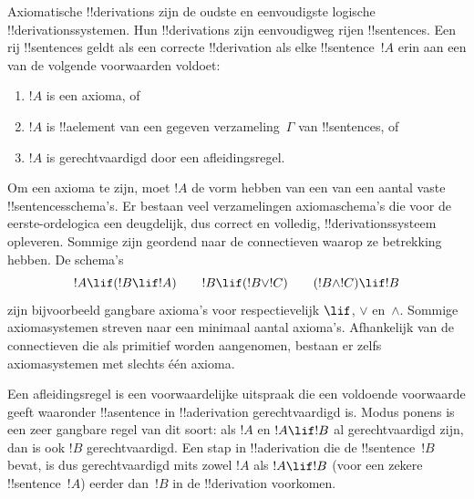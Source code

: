 \documentclass[../../../include/open-logic-section]{subfiles}
\begin{document}
      {}
      {}


Axiomatische !!{derivation}s zijn de oudste en eenvoudigste logische
!!{derivation}ssystemen. Hun !!{derivation}s zijn eenvoudigweg rijen
!!{sentence}s. Een rij !!{sentence}s geldt als een correcte
!!{derivation} als elke !!{sentence}~$!A$ erin aan een van de volgende
voorwaarden voldoet:
\begin{enumerate}
\item $!A$ is een axioma, of
\item $!A$ is !!a{element} van een gegeven verzameling~$\Gamma$ van !!{sentence}s, of
\item $!A$ is gerechtvaardigd door een afleidingsregel.
\end{enumerate}
Om een axioma te zijn, moet $!A$ de vorm hebben van een van een aantal
vaste !!{sentence}sschema's. Er bestaan veel verzamelingen
axiomaschema's die voor de eerste-ordelogica een deugdelijk, dus correct
en volledig, !!{derivation}ssysteem opleveren. Sommige zijn geordend
naar de connectieven waarop ze betrekking hebben. De schema's
\[
!A \lif (!B \lif !A) \qquad !B \lif (!B \lor !C) \qquad (!B \land !C) \lif !B
\]
zijn bijvoorbeeld gangbare axioma's voor respectievelijk $\lif$,
$\lor$ en~$\land$. Sommige axiomasystemen streven naar een minimaal
aantal axioma's. Afhankelijk van de connectieven die als primitief
worden aangenomen, bestaan er zelfs axiomasystemen met slechts één
axioma.

Een afleidingsregel is een voorwaardelijke uitspraak die een voldoende
voorwaarde geeft waaronder !!a{sentence} in !!a{derivation}
gerechtvaardigd is. Modus ponens is een zeer gangbare regel van dit
soort: als $!A$ en $!A \lif !B$ al gerechtvaardigd zijn, dan is ook
$!B$ gerechtvaardigd. Een stap in !!a{derivation} die de
!!{sentence}~$!B$ bevat, is dus gerechtvaardigd mits zowel $!A$ als
$!A \lif !B$ (voor een zekere !!{sentence}~$!A$) eerder dan~$!B$ in de
!!{derivation} voorkomen.
\end{document}

